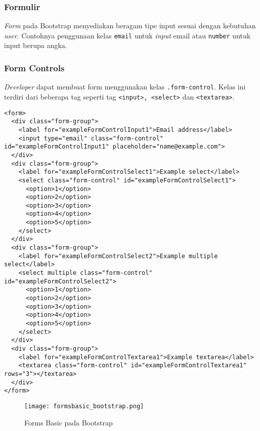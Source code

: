 \subsubsection{Formulir}
\textit{Form} pada Bootstrap menyediakan beragam tipe input sesuai dengan kebutuhan \textit{user}. Contohnya penggunaan kelas \texttt{email} untuk \textit{input} email atau \texttt{number} untuk input berupa angka.
\subsubsection{Form Controls}
\textit{Developer} dapat membuat form menggunakan kelas \texttt{.form-control}. Kelas ini terdiri dari beberapa tag seperti tag \texttt{<input>, <select>} dan \texttt{<textarea>}.
\begin{lstlisting}[frame=single, basicstyle=\tiny] 
<form>
  <div class="form-group">
    <label for="exampleFormControlInput1">Email address</label>
    <input type="email" class="form-control" id="exampleFormControlInput1" placeholder="name@example.com">
  </div>
  <div class="form-group">
    <label for="exampleFormControlSelect1">Example select</label>
    <select class="form-control" id="exampleFormControlSelect1">
      <option>1</option>
      <option>2</option>
      <option>3</option>
      <option>4</option>
      <option>5</option>
    </select>
  </div>
  <div class="form-group">
    <label for="exampleFormControlSelect2">Example multiple select</label>
    <select multiple class="form-control" id="exampleFormControlSelect2">
      <option>1</option>
      <option>2</option>
      <option>3</option>
      <option>4</option>
      <option>5</option>
    </select>
  </div>
  <div class="form-group">
    <label for="exampleFormControlTextarea1">Example textarea</label>
    <textarea class="form-control" id="exampleFormControlTextarea1" rows="3"></textarea>
  </div>
</form>
\end{lstlisting}

\begin{figure} [H]
	\centering  
	\texttt{[image: formsbasic\_bootstrap.png]}  
	\caption{Forms Basic pada Bootstrap} 
\end{figure} 
